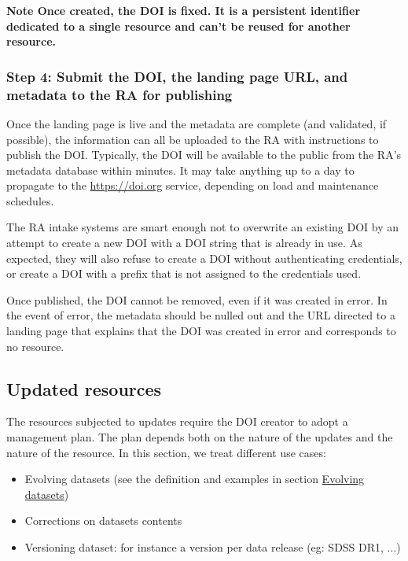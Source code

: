 \documentclass[11pt,a4paper]{ivoa}
\newcommand{\important}[1]{\textbf{\color{ivoacolor}Note #1 \\ }}
\begin{document}
\important{Once created, the DOI is fixed. It is a persistent identifier dedicated to a single resource and can't be reused for another resource.}


\subsubsection{Step 4: Submit the DOI, the landing page URL, and metadata to the RA for publishing}\hypertarget{step-4-submit-the-doi-the-landing-page-url-and-metadata-to-the-ra-for-publishing}{}\label{sec:step-4-submit-the-doi-the-landing-page-url-and-metadata-to-the-ra-for-publishing}

Once the landing page is live and the metadata are complete (and validated, if possible), the information can all be uploaded to the RA with instructions to publish the DOI. Typically, the DOI will be available to the public from the RA's metadata database within minutes. It may take anything up to a day to propagate to the \href{https://doi.org}{https://doi.org} service, depending on load and maintenance schedules.

The RA intake systems are smart enough not to overwrite an existing DOI by an attempt to create a new DOI with a DOI string that is already in use. As expected, they will also refuse to create a DOI without authenticating credentials, or create a DOI with a prefix that is not assigned to the credentials used.

Once published, the DOI cannot be removed, even if it was created in error. In the event of error, the metadata should be nulled out and the URL directed to a landing page that explains that the DOI was created in error and corresponds to no resource.

\subsection{Updated resources}\hypertarget{updated-resources}{}\label{sec:updated-resources}

The  resources subjected to updates require the DOI creator to adopt a management plan. The plan depends both on the nature of the updates and the nature of the resource.\newline
In this section, we treat different use cases:

\begin{itemize}
\item{} Evolving datasets (see the definition and examples in section \hyperlink{evolving-datasets}{Evolving datasets})
\item{} Corrections on datasets contents
\item{} Versioning dataset: for instance a version per data release (eg: SDSS DR1, ...)
\end{itemize}
\end{document}

